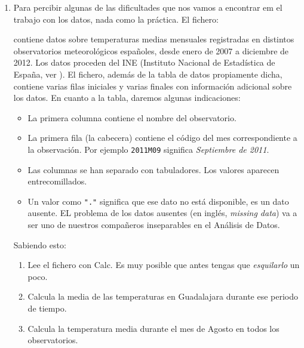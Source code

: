 \documentclass[10pt,a4paper]{article}\usepackage[]{graphicx}\usepackage[]{color}
\newcounter {cont01}
\begin{document}
\begin{enumerate}
  \item Para percibir algunas de las dificultades que nos vamos a encontrar em el trabajo con los datos, nada como la práctica. El fichero:
      \begin{center}
      \end{center}
      contiene datos sobre temperaturas medias mensuales registradas en distintos observatorios meteorológicos españoles, desde enero de 2007 a diciembre de 2012. Los datos proceden del INE (Instituto Nacional de Estadística de España, ver ). El fichero, además de la tabla de datos propiamente dicha, contiene varias filas iniciales y varias finales con información adicional sobre los datos. En cuanto a la tabla, daremos algunas indicaciones:
      \begin{itemize}
        \item La primera columna contiene el nombre del observatorio.
        \item La primera fila (la cabecera) contiene el código del mes correspondiente a la observación. Por ejemplo {\tt 2011M09} significa {\em Septiembre de 2011}.
        \item Las columnas se han separado con tabuladores. Los valores aparecen entrecomillados.
        \item Un valor como \verb#"."# significa que ese dato no está disponible, es un dato ausente. EL problema de los datos ausentes (en inglés, {\em missing data}) va a ser uno de nuestros compañeros inseparables en el Análisis de Datos.
      \end{itemize}
      Sabiendo esto:
      \begin{enumerate}
        \item Lee el fichero con Calc. Es muy posible que antes tengas que {\em esquilarlo} un poco.
        \item Calcula la media de las temperaturas en Guadalajara durante ese periodo de tiempo.
        \item Calcula la temperatura media durante el mes de Agosto en todos los observatorios.
      \end{enumerate}



\end{enumerate}
\end{document}
